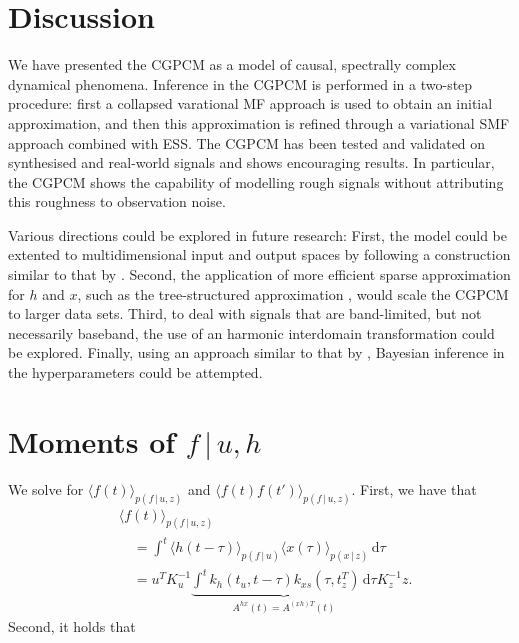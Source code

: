 \documentclass{article}
\newcommand{\id}[1]{\, \mathrm{d} #1}     %
\newcommand{\cond}{\, | \,}               %
\newcommand{\la}{\langle}
\newcommand{\ra}{\rangle}
\begin{document}
\section{Discussion}
We have presented the CGPCM as a model of causal, spectrally complex dynamical phenomena. Inference in the CGPCM is performed in a two-step procedure: first a collapsed varational MF approach is used to obtain an initial approximation, and then this approximation is refined through a variational SMF approach combined with ESS. The CGPCM has been tested and validated on synthesised and real-world signals and shows encouraging results. In particular, the CGPCM shows the capability of modelling rough signals without attributing this roughness to observation noise.

Various directions could be explored in future research: First, the model could be extented to multidimensional input and output spaces by following a construction similar to that by \citet{Bruinsma:2016:GGPCM}. Second, the application of more efficient sparse approximation for $h$ and $x$, such as the tree-structured approximation \cite{Bui:2014:Tree-Structured_Gaussian}, would scale the CGPCM to larger data sets. Third, to deal with signals that are band-limited, but not necessarily baseband, the use of an harmonic interdomain transformation \cite{Tobar:2015:Inter-Domain_Inducing} could be explored.
Finally, using an approach similar to that by \citet{Lazaro-Gredilla:2013:Variational_Inference_for_Mahalanobis_Distance}, Bayesian inference in the hyperparameters could be attempted.

\appendix
\section{Moments of $f\cond u, h$}
\label{app:moments_f}
We solve for $\la f(t) \ra_{p(f\cond u,z)}$ and $\la f(t) f(t') \ra_{p(f\cond u,z)}$. First, we have that
\begin{align*}
    &\la f(t) \ra_{p(f\cond u,z)} \\
    &\quad= \int^t \la h(t - \tau)\ra_{p(f\cond u)} \la x(\tau) \ra_{p(x\cond z)} \id{\tau} \\
    &\quad= u^T K_u^{-1} \underbrace{\int^t k_h(t_u,t-\tau) k_{xs}(\tau, t_z^T) \id{ \tau}}_{A^{hx}(t)=A^{(xh)T}(t)} K_z^{-1} z.
\end{align*}
Second, it holds that
\end{document}
